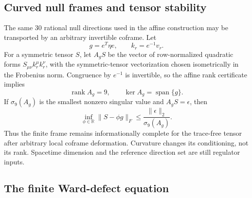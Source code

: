 \subsection{Curved null frames and tensor stability}

The same 30 rational null directions used in the affine construction may be
transported by an arbitrary invertible coframe.  Let
\begin{equation}
 g=e^T\eta e,\qquad k_r=e^{-1}v_r .
 \label{eq:nonlinear-curved-frame}
\end{equation}
For a symmetric tensor \(S\), let \(A_gS\) be the vector of row-normalized
quadratic forms \(S_{\mu\nu}k_r^\mu k_r^\nu\), with the symmetric-tensor
vectorization chosen isometrically in the Frobenius norm.  Congruence by
\(e^{-1}\) is invertible, so the affine rank certificate implies
\begin{equation}
 \operatorname{rank}A_g=9,\qquad
 \ker A_g=\operatorname{span}\{g\}.
 \label{eq:nonlinear-curved-rank}
\end{equation}
If \(\sigma_9(A_g)\) is the smallest nonzero singular value and
\(A_gS=\epsilon\), then
\begin{equation}
 \inf_{\phi\in\mathbb R}\|S-\phi g\|_F
 \le\frac{\|\epsilon\|_2}{\sigma_9(A_g)} .
 \label{eq:nonlinear-curved-stability}
\end{equation}
Thus the finite frame remains informationally complete for the trace-free
tensor after arbitrary local coframe deformation.  Curvature changes its
conditioning, not its rank.  Spacetime dimension and the reference
direction set are still regulator inputs.

\subsection{The finite Ward-defect equation}

